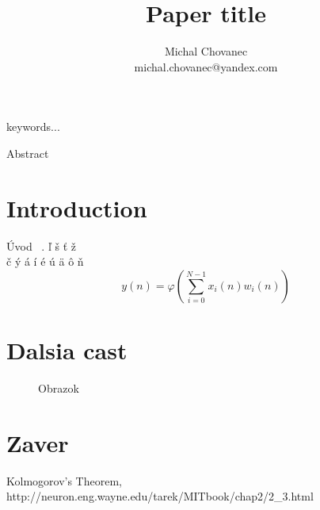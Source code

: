 \documentclass[10pt,a5paper]{article}
\begin{document}
\title{Paper title}
\author{Michal Chovanec\\
michal.chovanec@yandex.com}
\date{}
\maketitle 
\thispagestyle{empty}


 keywords...

 Abstract

\section{Introduction}

Úvod ~\cite{bib:Aproximation}.
ľ š ť ž  \\
č ý á í é ú ä ô ň \\

\begin{equation}
\label{McCulloch_Pitts}
  y(n) = \varphi(\sum_{i = 0}^{N-1} x_i(n)w_i(n))
\end{equation}


\section{Dalsia cast}

\begin{figure}[!ht]
\centering
\caption{Obrazok}
\label{obrazok}
\end{figure}

\section{Zaver}





\begin{thebibliography}{4}

 Kolmogorov's Theorem,
http://neuron.eng.wayne.edu/tarek/MITbook/chap2/2\_3.html


\end{thebibliography}
\end{document}
